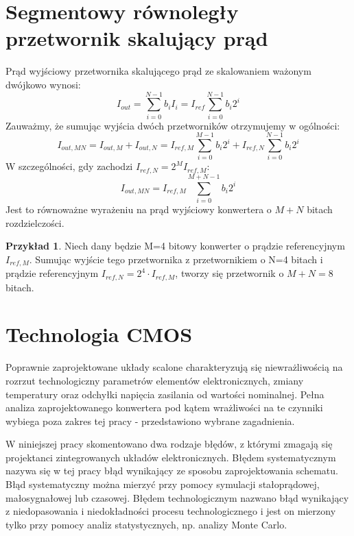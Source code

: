 \documentclass[10pt,a4paper,twoside]{report}
\theoremstyle{definition}
\theoremstyle{definition}
\theoremstyle{definition}
\newtheorem{przyklad}{Przykład}[section]
\theoremstyle{definition}
\theoremstyle{definition}
\begin{document}
{	\section{Segmentowy równoległy przetwornik skalujący prąd}
{	Prąd wyjściowy przetwornika skalującego prąd ze skalowaniem ważonym dwójkowo wynosi:
	\begin{equation}
	I_{out} = \sum_{i=0}^{N-1} b_i I_{i} = I_{ref} \sum_{i=0}^{N-1} b_i 2^{i}
	\end{equation}
	Zauważmy, że sumując wyjścia dwóch przetworników otrzymujemy w ogólności:
	\begin{equation}
	I_{out,MN} = I_{out,M} + I_{out,N}
	= I_{ref,M} \sum_{i=0}^{M-1} b_i 2^{i} + I_{ref,N} \sum_{i=0}^{N-1} b_i 2^{i}
	\end{equation}
	W szczególności, gdy zachodzi $I_{ref,N} = 2^M I_{ref,M}$:
	\begin{equation}
	I_{out,MN} = I_{ref,M} \sum_{i=0}^{M+N-1} b_i 2^{i}
	\end{equation}
	Jest to równoważne wyrażeniu na prąd wyjściowy konwertera o $M+N$ bitach rozdzielczości.
	\begin{przyklad}{Niech dany będzie M=4 bitowy konwerter o prądzie referencyjnym $I_{ref,M}$. Sumując wyjście tego przetwornika z przetwornikiem o N=4 bitach i prądzie referencyjnym $ I_{ref,N} = 2^4 \cdot I_{ref,M} $, tworzy się przetwornik o $M+N=8$ bitach.}
	\end{przyklad}	
}

	\section{Technologia CMOS}
	{	Poprawnie zaprojektowane układy scalone charakteryzują się niewrażliwością na rozrzut technologiczny parametrów elementów elektronicznych, zmiany temperatury oraz odchyłki napięcia zasilania od wartości nominalnej. Pełna analiza zaprojektowanego konwertera pod kątem wrażliwości na te czynniki wybiega poza zakres tej pracy - przedstawiono wybrane zagadnienia. }

	{	W niniejszej pracy skomentowano dwa rodzaje błędów, z którymi zmagają się projektanci zintegrowanych układów elektronicznych. Błędem systematycznym nazywa się w tej pracy błąd wynikający ze sposobu zaprojektowania schematu. Błąd systematyczny można mierzyć przy pomocy symulacji stałoprądowej, małosygnałowej lub czasowej. Błędem technologicznym nazwano błąd wynikający z niedopasowania i niedokładności procesu technologicznego i jest on mierzony tylko przy pomocy analiz statystycznych, np. analizy Monte Carlo. }

}
\end{document}
